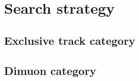 \clearpage
\section{Search strategy}
\label{sec:search-strategy}

\subsection{Exclusive track category}
\label{sec:exclusive-track-category}

\subsection{Dimuon category}
\label{sec:dimuon-category}